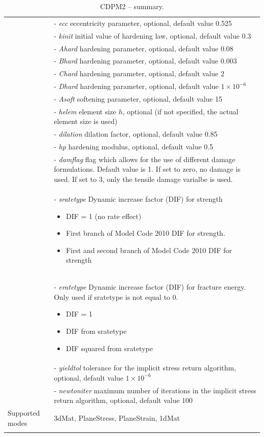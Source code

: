 \documentclass[a4paper]{article}
\newcommand{\param}[1]{{\it #1}}
\begin{document}
\begin{longtable}{|l|p{9cm}|}
&- \param{ecc} eccentricity parameter, optional, default value 0.525\\
&- \param{kinit} initial value of hardening law, optional, default value 0.3\\
&- \param{Ahard} hardening parameter, optional, default value 0.08\\
&- \param{Bhard} hardening parameter, optional, default value 0.003\\
&- \param{Chard} hardening parameter, optional, default value 2\\
&- \param{Dhard} hardening parameter, optional, default value $1\times 10^{-6}$\\
&- \param{Asoft} softening parameter, optional, default value 15\\
&- \param{helem} element size $h$, optional (if not specified, the actual element size is used)\\
&- \param{dilation} dilation factor, optional, default value 0.85\\
&- \param{hp} hardening modulus, optional, default value 0.5\\
&- \param{damflag} flag which allows for the use of different damage formulations. Default value is 1. If set to zero, no damage is used. If set to 3, only the tensile damage varialbe is used.\\
&- \param{sratetype}  Dynamic increase factor (DIF) for strength
\begin{itemize}\setlength{\itemsep}{-3pt}
\item[0 -] DIF = 1  (no rate effect)
\item[1 -] First branch of Model Code 2010 DIF for strength.
\item[2 -] First and second branch of Model Code 2010 DIF for strength
\end{itemize}\\
&- \param{eratetype} Dynamic increase factor (DIF) for fracture energy. Only used if sratetype is not equal to 0. 
\begin{itemize}\setlength{\itemsep}{-3pt}
\item[0 -] DIF = 1
\item[1 -] DIF from sratetype  
\item[2 -] DIF squared from sratetype
\end{itemize}\\
&- \param{yieldtol} tolerance for the implicit stress return algorithm, optional, default value $1 \times 10^{-6}$\\
&- \param{newtoniter} maximum number of iterations in the implicit stress return algorithm, optional, default value 100\\
Supported modes& 3dMat, PlaneStress, PlaneStrain, 1dMat\\
\hline
\caption{CDPM2 -- summary.}
\label{cdpm2_table}
\end{longtable}
\end{document}
